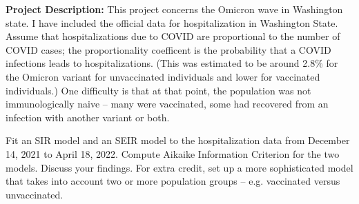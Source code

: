 \documentclass{article}
\begin{document}
\textbf{Project Description: }This project concerns the Omicron wave in Washington state. I have included the official data for hospitalization in Washington State. Assume that hospitalizations due to COVID are proportional to the number of COVID cases; the proportionality coefficent is the probability that a COVID infections leads to hospitalizations. (This was estimated to be around 2.8\% for the Omicron variant for unvaccinated individuals and lower for vaccinated individuals.) One difficulty is that at that point, the population was not immunologically naive – many were vaccinated, some had recovered from an infection with another variant or both. \medskip

Fit an SIR model and an SEIR model to the hospitalization data from December 14, 2021 to April 18, 2022. Compute Aikaike Information Criterion for the two models. Discuss your findings. For extra credit, set up a more sophisticated model that takes into account two or more population groups – e.g. vaccinated versus unvaccinated.
\medskip
\end{document}

